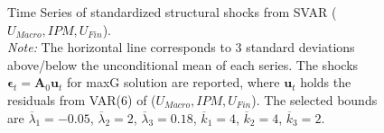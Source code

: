 \documentclass[a4paper,11pt,listof=nochaptergap,oneside,pointednumbers,bibtotoc,bigheadings,liststotoc]{scrbook}
\theoremstyle{mysatz}
\theoremstyle{mydefinition}
\theoremstyle{mybemerkung}
\newcommand{\vect}[1]{\boldsymbol{\mathbf{#1}}}
\begin{document}
\begin{figure}[!h]
   \centering
   \setlength\fboxsep{0pt}
   \setlength\fboxrule{0pt}
      \caption[Time Series of standardized structural shocks from SVAR ($U_{Macro}, IPM, U_{Fin}$).]{Time Series of standardized structural shocks from SVAR ($U_{Macro}, IPM, U_{Fin}$).\\
      \textit{Note:}  The horizontal line corresponds to 3 standard deviations above/below the unconditional mean of each series. The shocks $\vect{\epsilon}_t = \vect{A}_0\vect{u}_t$ for maxG solution are reported, where $\vect{u}_t$ holds the residuals from VAR(6) of ($U_{Macro}, IPM, U_{Fin}$). The selected bounds are $\overline{\lambda}_1 = -0.05$, $\overline{\lambda}_2 = 2$, $\overline{\lambda}_3 = 0.18$, $\overline{k}_1 = 4$, $\overline{k}_2 = 4$, $\overline{k}_3 = 2$.}   \label{fig:ludvigsonetal_timeseries_e_shocks}
\end{figure}
\end{document}
